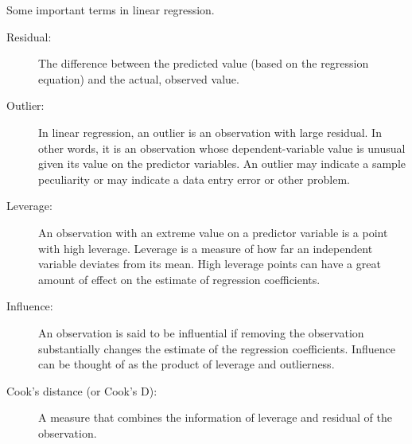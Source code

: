 \documentclass[residuals.tex]{subfiles}
\begin{document}
\newpage

Some important terms in linear regression.
\begin{description}
	\item[Residual: ] The difference between the predicted value (based on the regression equation) and the actual, observed value.
	\item[Outlier:]  In linear regression, an outlier is an observation with large residual.  In other words, it is an observation whose dependent-variable value is unusual given its value on the predictor variables.  An outlier may indicate a sample peculiarity or may indicate a data entry error or other problem. 
	\item[Leverage:]  An observation with an extreme value on a predictor variable is a point with high leverage.  Leverage is a measure of how far an independent variable deviates from its mean.  High leverage points can have a great amount of effect on the estimate of regression coefficients. 
	\item[Influence:]  An observation is said to be influential if removing the observation substantially changes the estimate of the regression coefficients.  Influence can be thought of as the product of leverage and outlierness.  
	\item[Cook's distance (or Cook's D):] A measure that combines the information of leverage and residual of the observation.  
\end{description}
\end{document}
